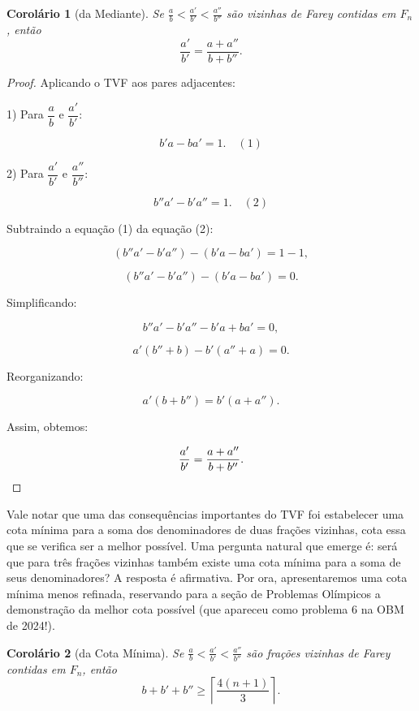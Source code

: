 \documentclass{hipatia}
\newtheorem*{corollary*}{Corolário} %
\theoremstyle{definition} %
\begin{document}
\begin{corollary*} [da Mediante]
Se $\frac{a}{b}<\frac{a'}{b'}<\frac{a''}{b''}$ são vizinhas de Farey contidas em \(F_n\), então
\[
\frac{a'}{b'}=\frac{a+a''}{b+b''}.
\]

\end{corollary*}

\begin{proof} Aplicando o TVF aos pares adjacentes:

1) Para \(\dfrac{a}{b}\) e \(\dfrac{a'}{b'}\):

\[
b'a - ba' = 1. \quad (1)
\]

2) Para \(\dfrac{a'}{b'}\) e \(\dfrac{a''}{b''}\):

\[
b''a' - b'a'' = 1. \quad (2)
\]

Subtraindo a equação (1) da equação (2):

\[
(b''a' - b'a'') - (b'a - ba') = 1 - 1,
\]

\[
(b''a' - b'a'') - (b'a - ba') = 0.
\]

Simplificando:

\[
b''a' - b'a'' - b'a + ba' = 0,
\]

\[
a'(b'' + b) - b'(a'' + a) = 0.
\]

Reorganizando:

\[
a'(b + b'') = b'(a + a'').
\]

Assim, obtemos:

\[
\dfrac{a'}{b'} = \dfrac{a + a''}{b + b''}.\qedhere
\]
\end{proof}

Vale notar que uma das consequências importantes do TVF foi estabelecer uma cota mínima para a soma dos denominadores de duas frações vizinhas, cota essa que se verifica ser a melhor possível. Uma pergunta natural que emerge é: será que para três frações vizinhas também existe uma cota mínima para a soma de seus denominadores? A resposta é afirmativa. Por ora, apresentaremos uma cota mínima menos refinada, reservando para a seção de Problemas Olímpicos a demonstração da melhor cota possível (que apareceu como problema 6 na OBM de 2024!).

\begin{corollary*} [da Cota Mínima]
Se $\frac{a}{b}<\frac{a'}{b'}<\frac{a''}{b''}$ são frações vizinhas de Farey contidas em \(F_n\), então
\[
b+b'+b''\geq \left\lceil \frac{4(n+1)}{3} \right\rceil.
\]
\end{corollary*}
\end{document}
